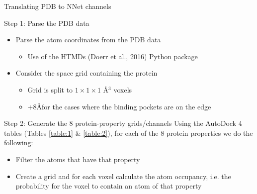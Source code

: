 \documentclass{beamer}
\begin{document}
\begin{frame}{Translating PDB to NNet channels}
  \begin{block}{Step 1: Parse the PDB data}
    \begin{itemize}
      \item Parse the atom coordinates from the PDB data
      \begin{itemize}
        \item Use of the HTMDs (Doerr et al., 2016) Python package
      \end{itemize}
      \item Consider the space grid containing the protein
      \begin{itemize}
        \item Grid is split to $1 \times 1 \times 1 $ \AA$^3$ voxels
        \item $+8$\AA \;for the cases where the binding pockets are on the edge
      \end{itemize}
    \end{itemize}
  \end{block}

  \begin{block}{Step 2: Generate the 8 protein-property grids/channels}
  Using the AutoDock 4 tables (Tables \ref{table:1} \& \ref{table:2}), for each of the 8 protein properties we do the following:
    \begin{itemize}
      \item Filter the atoms that have that property
      \item Create a grid and for each voxel calculate the atom occupancy, i.e. the probability for the voxel to contain an atom of that property
    \end{itemize}
  \end{block}
\end{frame}
\end{document}
